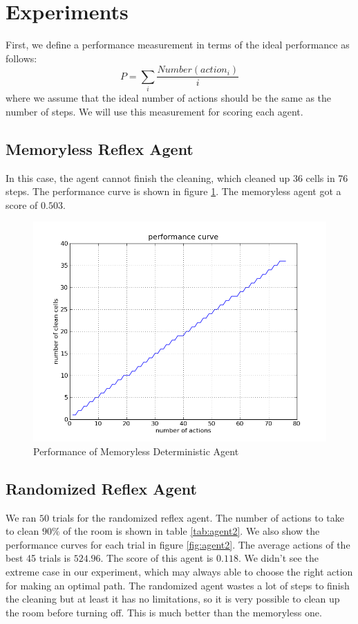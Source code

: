 \section{Experiments}
First, we define a performance measurement in terms of the ideal performance as follows:
\[
P = \sum_i \frac{Number(action_i)}{i}
\]
where we assume that the ideal number of actions should be the same as the number of steps. We will use this measurement for scoring each agent.

\subsection{Memoryless Reflex Agent}
In this case, the agent cannot finish the cleaning, which cleaned up $36$ cells in 76 steps. The performance curve is shown in figure \ref{fig:agent1}. The memoryless agent got a score of $0.503$.

\begin{figure}[!h]
\centering
\includegraphics[scale=.35]{img/agent1.png}
\caption{Performance of Memoryless Deterministic Agent}
\label{fig:agent1}
\end{figure}

\subsection{Randomized Reflex Agent}
We ran $50$ trials for the randomized reflex agent. The number of actions to take to clean $90\%$ of the room is shown in table \ref{tab:agent2}. We also show the performance curves for each trial in figure \ref{fig:agent2}. The average actions of the best 45 trials is $524.96$. The score of this agent is $0.118$. We didn't see the extreme case in our experiment, which may always able to choose the right action for making an optimal path. The randomized agent wastes a lot of steps to finish the cleaning but at least it has no limitations, so it is very possible to clean up the room before turning off. This is much better than the memoryless one.

